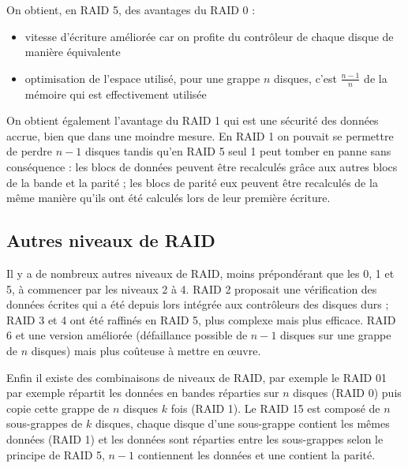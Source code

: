 On obtient, en RAID 5, des avantages du RAID 0 :
\begin{itemize}
	\item vitesse d'écriture améliorée car on profite  du contrôleur de chaque disque de manière équivalente 
    \item optimisation de l'espace utilisé, pour une grappe $n$ disques, c'est $\frac{n-1}{n}$ de la mémoire qui est effectivement utilisée
\end{itemize}

On obtient également l'avantage du RAID 1 qui est une sécurité des données accrue, bien que dans une moindre mesure. En RAID 1 on pouvait se permettre de perdre $n-1$ disques tandis qu'en RAID 5 seul 1 peut tomber en panne sans conséquence : les blocs de données peuvent être recalculés grâce aux autres blocs de la bande et la parité ; les blocs de parité eux peuvent être recalculés de la même manière qu'ils ont été calculés lors de leur première écriture. 

\subsection{Autres niveaux de RAID}
Il y a de nombreux autres niveaux de RAID, moins prépondérant que les 0, 1 et 5, à commencer par les niveaux 2 à 4. RAID 2 proposait une vérification des données écrites qui a été depuis lors intégrée aux contrôleurs des disques durs ; RAID 3 et 4 ont été raffinés en RAID 5, plus complexe mais plus efficace. RAID 6 et une version améliorée (défaillance possible de $n-1$ disques sur une grappe de $n$ disques) mais plus coûteuse à mettre en \oe{}uvre. 

Enfin il existe des combinaisons de niveaux de RAID, par exemple le RAID 01 par exemple répartit les données en bandes réparties sur $n$ disques (RAID 0) puis copie cette grappe de $n$ disques $k$ fois (RAID 1). Le RAID 15 est composé de $n$ sous-grappes de $k$ disques, chaque disque d'une sous-grappe contient les mêmes données (RAID 1) et les données sont réparties entre les sous-grappes selon le principe de RAID 5, $n-1$ contiennent les données et une contient la parité. 